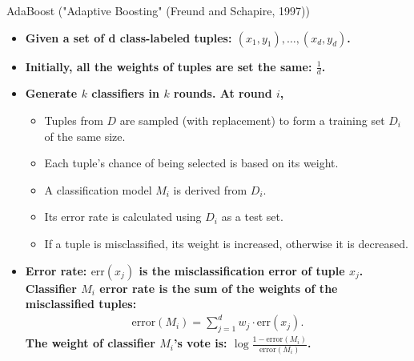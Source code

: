\begin{frame}{AdaBoost ("Adaptive Boosting" (Freund and Schapire, 1997))}
  \begin{itemize}
  \item \textbf{Given a set of d class-labeled tuples: $(x_1 , y_1), \ldots, (x_d, y_d)$.}
  \item \textbf{Initially, all the weights of tuples are set the same: $\frac{1}{d}$.}
  \item \textbf{Generate $k$ classifiers in $k$ rounds. At round $i$,}
    \begin{itemize}
    \item Tuples from $D$ are sampled (with replacement) to form a training set $D_i$ of the same size.
    \item Each tuple's chance of being selected is based on its weight.
    \item A classification model $M_i$ is derived from $D_i$.
    \item Its error rate is calculated using $D_i$ as a test set.
    \item If a tuple is misclassified, its weight is increased, otherwise it is decreased.
    \end{itemize}
  \item \textbf{Error rate: $\text{err}(x_j)$ is the misclassification error of tuple $x_j$. Classifier $M_i$ error rate is the sum of the weights of the misclassified tuples:}
    \begin{align}
      \text{error}(M_i) = \sum_{j=1}^{d} w_j \cdot \text{err}(x_j).
    \end{align}
    \textbf{The weight of classifier $M_i$'s vote is: $\log \frac{1-\text{error}(M_i)}{\text{error}(M_i)}$.}
  \end{itemize}
\end{frame}

